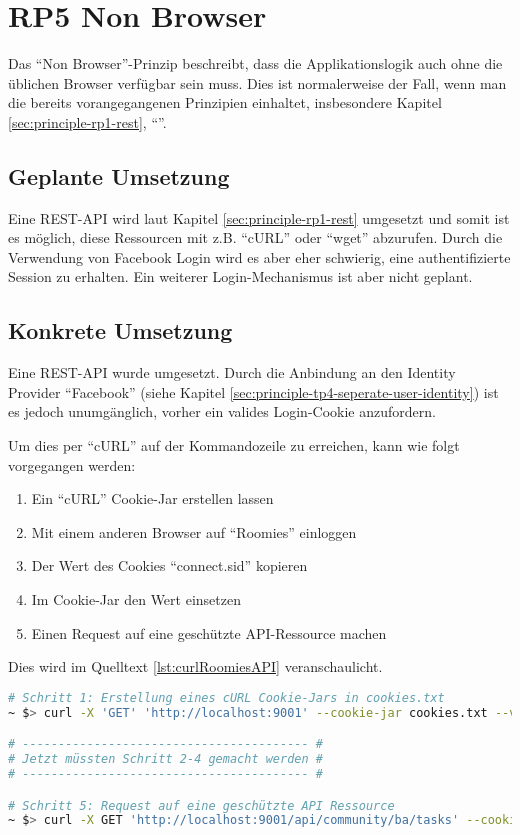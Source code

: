 \section{RP5 Non Browser}
\label{sec:principle-rp5-non-browser}

Das ``Non Browser''-Prinzip beschreibt, dass die Applikationslogik auch ohne die üblichen Browser verfügbar sein muss. Dies ist normalerweise der Fall, wenn man die bereits vorangegangenen Prinzipien einhaltet, insbesondere Kapitel \ref{sec:principle-rp1-rest}, ``''.

\subsection*{Geplante Umsetzung}
Eine REST-API wird laut Kapitel \ref{sec:principle-rp1-rest} umgesetzt und somit ist es möglich, diese Ressourcen mit z.B. ``cURL'' \cite{curl} oder ``wget'' \cite{wget} abzurufen.
Durch die Verwendung von Facebook Login wird es aber eher schwierig, eine authentifizierte Session zu erhalten. Ein weiterer Login-Mechanismus ist aber nicht geplant.

\subsection*{Konkrete Umsetzung}
Eine REST-API wurde umgesetzt. Durch die Anbindung an den Identity Provider ``Facebook'' (siehe Kapitel \ref{sec:principle-tp4-seperate-user-identity}) ist es jedoch unumgänglich, vorher ein valides Login-Cookie anzufordern.

Um dies per ``cURL'' auf der Kommandozeile zu erreichen, kann wie folgt vorgegangen werden:
\begin{enumerate}
	\item Ein ``cURL'' Cookie-Jar erstellen lassen
	\item Mit einem anderen Browser auf ``Roomies'' einloggen
	\item Der Wert des Cookies ``connect.sid'' kopieren
	\item Im Cookie-Jar den Wert einsetzen
	\item Einen Request auf eine geschützte API-Ressource machen
\end{enumerate}

Dies wird im Quelltext \ref{lst:curlRoomiesAPI} veranschaulicht.

\begin{lstlisting}[language=Bash, caption=cURL Request auf Roomies, label=lst:curlRoomiesAPI]
# Schritt 1: Erstellung eines cURL Cookie-Jars in cookies.txt
~ $> curl -X 'GET' 'http://localhost:9001' --cookie-jar cookies.txt --verbose --location

# ---------------------------------------- #
# Jetzt müssten Schritt 2-4 gemacht werden #
# ---------------------------------------- #

# Schritt 5: Request auf eine geschützte API Ressource
~ $> curl -X GET 'http://localhost:9001/api/community/ba/tasks' --cookie cookies.txt  --verbose --location
\end{lstlisting}

